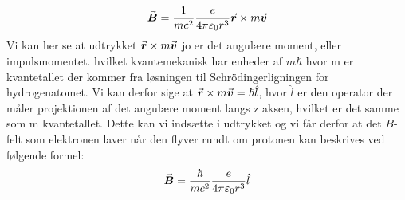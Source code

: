 \documentclass[../../Atom-ogMolekylefysik.tex]{subfiles}
\begin{document}
\begin{equation}
    {\vec{\boldsymbol{B}}}=\frac{1}{mc^2}\frac{e}{4\pi\varepsilon_0r^3}{\vec{\boldsymbol{r}}}\times m{\vec{\boldsymbol{v}}}
\end{equation}
Vi kan her se at udtrykket ${\vec{\boldsymbol{r}}}\times m{\vec{\boldsymbol{v}}}$ jo er det angulære moment, eller impulsmomentet. hvilket kvantemekanisk har enheder af $m\hbar$ hvor m er kvantetallet der kommer fra løsningen til Schrödingerligningen for hydrogenatomet. Vi kan derfor sige at ${\vec{\boldsymbol{r}}}\times m{\vec{\boldsymbol{v}}}=\hbar\hat{l}$, hvor $\hat{l}$ er den operator der måler projektionen af det angulære moment langs z aksen, hvilket er det samme som m kvantetallet. Dette kan vi indsætte i udtrykket og vi får derfor at det $B$-felt som elektronen laver når den flyver rundt om protonen kan beskrives ved følgende formel:
\begin{equation}
    {\vec{\boldsymbol{B}}}=\frac{\hbar}{mc^2}\frac{e}{4\pi\varepsilon_0r^3}\hat{l}
\end{equation}
\end{document}
